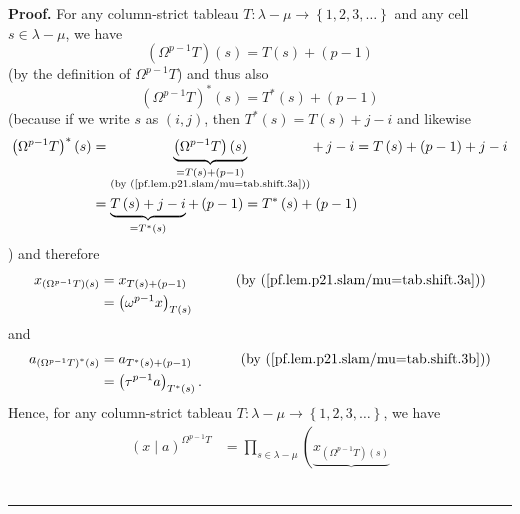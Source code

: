 \documentclass[numbers=enddot,12pt,final,onecolumn,notitlepage]{scrartcl}%
\theoremstyle{definition}
\newenvironment{proof}[1][Proof]{\noindent\textbf{#1.} }{\ \rule{0.5em}{0.5em}}
\let\prodnonlimits\prod
\renewcommand{\prod}{\prodnonlimits\limits}
\begin{document}
\begin{enumerate}
\begin{proof}
For any column-strict tableau $T:\lambda-\mu\rightarrow\left\{  1,2,3,\ldots
\right\}  $ and any cell $s\in\lambda-\mu$, we have
\begin{equation}
\left(  \Omega^{p-1}T\right)  \left(  s\right)  =T\left(  s\right)  +\left(
p-1\right)  \label{pf.lem.p21.slam/mu=tab.shift.3a}%
\end{equation}
(by the definition of $\Omega^{p-1}T$) and thus also
\begin{equation}
\left(  \Omega^{p-1}T\right)  ^{\ast}\left(  s\right)  =T^{\ast}\left(
s\right)  +\left(  p-1\right)  \label{pf.lem.p21.slam/mu=tab.shift.3b}%
\end{equation}
(because if we write $s$ as $\left(  i,j\right)  $, then $T^{\ast}\left(
s\right)  =T\left(  s\right)  +j-i$ and likewise
\begin{align*}
\left(  \Omega^{p-1}T\right)  ^{\ast}\left(  s\right)   &
=\underbrace{\left(  \Omega^{p-1}T\right)  \left(  s\right)  }%
_{\substack{=T\left(  s\right)  +\left(  p-1\right)  \\\text{(by
(\ref{pf.lem.p21.slam/mu=tab.shift.3a}))}}}+\,j-i=T\left(  s\right)  +\left(
p-1\right)  +j-i\\
&  =\underbrace{T\left(  s\right)  +j-i}_{=T^{\ast}\left(  s\right)  }+\left(
p-1\right)  =T^{\ast}\left(  s\right)  +\left(  p-1\right)
\end{align*}
) and therefore%
\begin{align}
x_{\left(  \Omega^{p-1}T\right)  \left(  s\right)  }  &  =x_{T\left(
s\right)  +\left(  p-1\right)  }\ \ \ \ \ \ \ \ \ \ \left(  \text{by
(\ref{pf.lem.p21.slam/mu=tab.shift.3a})}\right) \nonumber\\
&  =\left(  \omega^{p-1}x\right)  _{T\left(  s\right)  }
\label{pf.lem.p21.slam/mu=tab.shift.3c}%
\end{align}
and%
\begin{align}
a_{\left(  \Omega^{p-1}T\right)  ^{\ast}\left(  s\right)  }  &  =a_{T^{\ast
}\left(  s\right)  +\left(  p-1\right)  }\ \ \ \ \ \ \ \ \ \ \left(  \text{by
(\ref{pf.lem.p21.slam/mu=tab.shift.3b})}\right) \nonumber\\
&  =\left(  \tau^{p-1}a\right)  _{T^{\ast}\left(  s\right)  }.
\label{pf.lem.p21.slam/mu=tab.shift.3d}%
\end{align}
Hence, for any column-strict tableau $T:\lambda-\mu\rightarrow\left\{
1,2,3,\ldots\right\}  $, we have
\begin{align}
\left(  x\mid a\right)  ^{\Omega^{p-1}T}  &  =\prod_{s\in\lambda-\mu}\left(
\underbrace{x_{\left(  \Omega^{p-1}T\right)  \left(  s\right)  }%
}
\end{align}
\end{proof}
\end{enumerate}
\end{document}
